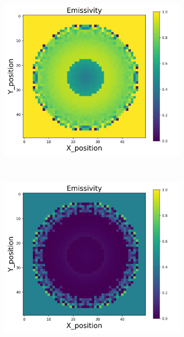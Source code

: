 \begin{figure}[p]
\begin{minipage}{\textwidth}
\begin{subfigure}{0.325\textwidth}
        \end{subfigure}
        \begin{subfigure}{0.325\textwidth}
            \centering
            \includegraphics[width=\textwidth]{figures/raw_data/31/quad/emi_cal.jpg}
        \end{subfigure}
    \end{minipage}\\
    \begin{minipage}{\textwidth}
        \centering
        \begin{subfigure}{0.325\textwidth}
            \centering
            \includegraphics[width=\textwidth]{figures/raw_data/32/quad/emi_cal.jpg}

\end{subfigure}
\end{minipage}
\end{figure}
